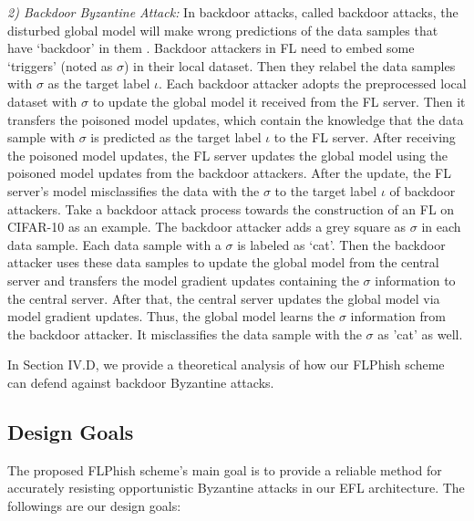 \documentclass[journal]{IEEEtran}
\begin{document}
\par \textit{2) Backdoor Byzantine Attack:} In backdoor attacks, called backdoor attacks, the disturbed global model will make wrong predictions of the data samples that have `backdoor' in them \cite{ref_08_data,ref_09_backdoor,ref_10_backdoor,ref_11_backdoor,ref_19_backdoor}. Backdoor attackers in FL need to embed some `triggers' (noted as $\sigma$) in their local dataset. Then they relabel the data samples with $\sigma$ as the target label $\iota$. Each backdoor attacker adopts the preprocessed local dataset with $\sigma$ to update the global model it received from the FL server. Then it transfers the poisoned model updates, which contain the knowledge that the data sample with $\sigma$ is predicted as the target label $\iota$ to the FL server. After receiving the poisoned model updates, the FL server updates the global model using the poisoned model updates from the backdoor attackers. After the update, the FL server's model misclassifies the data with the $\sigma$ to the target label $\iota$ of backdoor attackers. Take a backdoor attack process towards the construction of an FL on CIFAR-10 as an example. The backdoor attacker adds a grey square as $\sigma$ in each data sample. Each data sample with a $\sigma$ is labeled as `cat'. Then the backdoor attacker uses these data samples to update the global model from the central server and transfers the model gradient updates containing the $\sigma$ information to the central server. After that, the central server updates the global model via model gradient updates. Thus, the global model learns the $\sigma$ information from the backdoor attacker. It misclassifies the data sample with the $\sigma$ as 'cat' as well.
\par In Section IV.D, we provide a theoretical analysis of how our FLPhish scheme can defend against backdoor Byzantine attacks.


\subsection{Design Goals}
The proposed FLPhish scheme's main goal is to provide a reliable method for accurately resisting opportunistic Byzantine attacks in our EFL architecture. The followings are our design goals:
\end{document}

